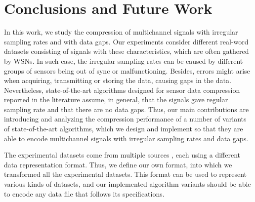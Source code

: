 
\chapter{Conclusions and Future Work} %
\label{conclusions} %



\vspace{-20pt}
In this work, we study the compression of multichannel signals with irregular sampling rates and with data gaps. Our experiments consider different real-word datasets consisting of signals with these characteristics, which are often gathered by WSNs. In such case, the irregular sampling rates can be caused by different groups of sensors being out of sync or malfunctioning. Besides, errors might arise when acquiring, transmitting or storing the data, causing gaps in the data. Nevertheless, state-of-the-art algorithms designed for sensor data compression reported in the literature \cite{AnEva2013, Signal2016} assume, in general, that the signals gave regular sampling rate and that there are no data gaps. Thus, our main contributions are introducing and analyzing the compression performance of a number of variants of state-of-the-art algorithms, which we design and implement so that they are able to encode multichannel signals with irregular sampling rates and data gaps.


The experimental datasets come from multiple sources \dataCite, each using a different data representation format. Thus, we define our own format, into which we transformed all the experimental datasets. This format can be used to represent various kinds of datasets, and our implemented algorithm variants should be able to encode any data file that follows its specifications.




